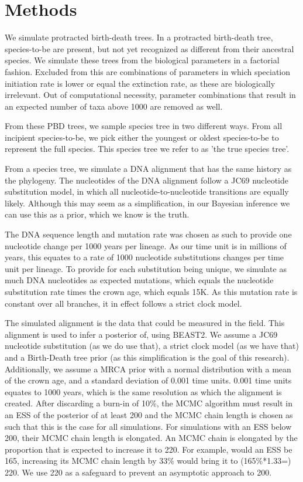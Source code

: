 \documentclass{article}
\begin{document}
\section{Methods}

We simulate protracted birth-death trees. In a protracted birth-death tree,
species-to-be are present, but not yet recognized as different from
their ancestral species. We simulate these trees from the biological parameters 
in a factorial fashion. Excluded from this are combinations of parameters in which
speciation initiation rate is lower or equal the extinction rate, as these
are biologically irrelevant. Out of computational necessity, 
parameter combinations that result in an expected number of taxa above 1000 
are removed as well.

From these PBD trees, we sample species tree in two different ways. 
From all incipient species-to-be, we pick either the youngest or oldest
species-to-be to represent the full species. This species tree we refer
to as 'the true species tree'.

From a species tree, we simulate a DNA alignment that has the same history
as the phylogeny. The nucleotides of the DNA alignment follow a JC69
nucleotide substitution model, in which all nucleotide-to-nucleotide transitions
are equally likely. Although this may seem as a simplification, in our Bayesian
inference we can use this as a prior, which we know is the truth.

The DNA sequence length and mutation rate was chosen as such to provide one
nucleotide change per 1000 years per lineage. As our time unit is in 
millions of years, this equates to a rate of 1000 nucleotide substitutions 
changes per time unit per lineage. To provide for each substitution being unique,
we simulate as much DNA nucleotides as expected mutations, which equals the
nucleotide substitution rate times the crown age, which equals 15K. As this
mutation rate is constant over all branches, it in effect follows a strict 
clock model.

The simulated alignment is the data that could be measured in the field.
This alignment is used to infer a posterior of, using BEAST2. We assume a
JC69 nucleotide substitution (as we do use that), a strict clock model (as
we have that) and a Birth-Death tree prior (as this simplification is the goal
of this research). Additionally, we assume a MRCA prior with a normal distribution
with a mean of the crown age, and a standard deviation of 0.001 time units. 0.001
time units equates to 1000 years, which is the same resolution as which the
alignment is created. After discarding a burn-in of 10\%, the MCMC algorithm must 
result in an ESS of the posterior of at least 200 and the MCMC chain length is 
chosen as such that this is the case for all simulations. For simulations
with an ESS below 200, their MCMC chain length is elongated. An
MCMC chain is elongated by the proportion that is expected to increase it to 220. 
For example, would an ESS be 165, increasing its MCMC chain length by 33\% 
would bring it to (165\%*1.33=) 220. We use
220 as a safeguard to prevent an asymptotic approach to 200. 
\end{document}
